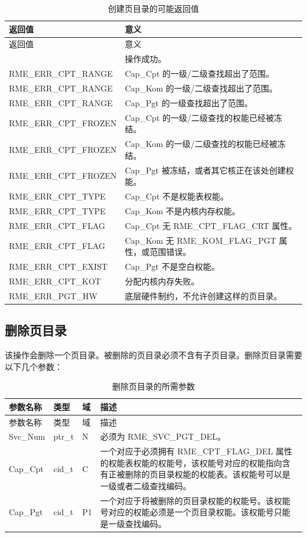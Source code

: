 \begin{xltabular}{\textwidth}{@{}>{\hsize\raggedright\arraybackslash}X>{\hsize\raggedright\arraybackslash}X@{}}
\caption{创建页目录的可能返回值}\label{tab:3-11-create-page-directory-return-values}\\
\toprule
返回值 & 意义\tabularnewline
\endfirsthead
\toprule
返回值 & 意义\tabularnewline
\midrule
\endhead
\bottomrule
{} & 操作成功。\tabularnewline
    RME\_ERR\_CPT\_RANGE & Cap\_Cpt 的一级/二级查找超出了范围。\tabularnewline
    RME\_ERR\_CPT\_RANGE & Cap\_Kom 的一级/二级查找超出了范围。\tabularnewline
    RME\_ERR\_CPT\_RANGE & Cap\_Pgt 的一级查找超出了范围。\tabularnewline
    RME\_ERR\_CPT\_FROZEN & Cap\_Cpt 的一级/二级查找的权能已经被冻结。\tabularnewline
    RME\_ERR\_CPT\_FROZEN & Cap\_Kom 的一级/二级查找的权能已经被冻结。\tabularnewline
    RME\_ERR\_CPT\_FROZEN & Cap\_Pgt 被冻结，或者其它核正在该处创建权能。\tabularnewline
    RME\_ERR\_CPT\_TYPE & Cap\_Cpt 不是权能表权能。\tabularnewline
    RME\_ERR\_CPT\_TYPE & Cap\_Kom 不是内核内存权能。\tabularnewline
    RME\_ERR\_CPT\_FLAG & Cap\_Cpt 无 RME\_CPT\_FLAG\_CRT 属性。\tabularnewline
    RME\_ERR\_CPT\_FLAG & Cap\_Kom 无 RME\_KOM\_FLAG\_PGT 属性，或范围错误。\tabularnewline
    RME\_ERR\_CPT\_EXIST & Cap\_Pgt 不是空白权能。\tabularnewline
    RME\_ERR\_CPT\_KOT & 分配内核内存失败。\tabularnewline
    RME\_ERR\_PGT\_HW & 底层硬件制约，不允许创建这样的页目录。\tabularnewline
\end{xltabular}

\subsection{删除页目录}\label{subsec:3-delete-page-directory}
\nopagebreak[4]

该操作会删除一个页目录。被删除的页目录必须不含有子页目录。删除页目录需要以下几个参数：

\begin{xltabular}{\textwidth}{@{}>{\hsize\raggedright\arraybackslash}X>{\hsize\raggedright\arraybackslash}X>{\hsize\raggedright\arraybackslash}X>{\hsize\raggedright\arraybackslash}X@{}}
\caption{删除页目录的所需参数}\label{tab:3-12-delete-page-directory-parameters}\\
\toprule
参数名称 & 类型 & 域 & 描述\tabularnewline
\endfirsthead
\toprule
参数名称 & 类型 & 域 & 描述\tabularnewline
\midrule
\endhead
\bottomrule
\endlastfoot
Svc\_Num & ptr\_t & N & 必须为 RME\_SVC\_PGT\_DEL。\tabularnewline
Cap\_Cpt & cid\_t & C &
一个对应于必须拥有 RME\_CPT\_FLAG\_DEL 属性的权能表权能的权能号，该权能号对应的权能指向含有正被删除的页目录权能的权能表。该权能号可以是一级或者二级查找编码。\tabularnewline
Cap\_Pgt & cid\_t & P1 &
一个对应于将被删除的页目录权能的权能号。该权能号对应的权能必须是一个页目录权能。该权能号只能是一级查找编码。\tabularnewline
\end{xltabular}

